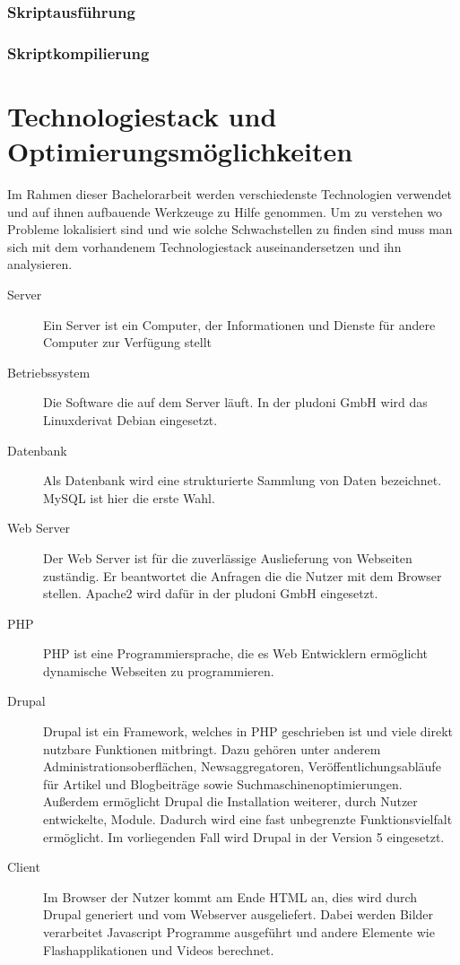 \subsubsection{Skriptausführung}
\subsubsection{Skriptkompilierung}

\section{Technologiestack und Optimierungsmöglichkeiten}
Im Rahmen dieser Bachelorarbeit werden verschiedenste Technologien verwendet und auf ihnen aufbauende Werkzeuge zu Hilfe genommen. Um zu verstehen wo Probleme lokalisiert sind und wie solche Schwachstellen zu finden sind muss man sich mit dem vorhandenem Technologiestack auseinandersetzen und ihn analysieren.
\begin{description}
  \item[Server] Ein Server ist ein Computer, der Informationen und Dienste für andere Computer zur Verfügung stellt
  \item[Betriebssystem] Die Software die auf dem Server läuft. In der pludoni GmbH wird das Linuxderivat Debian eingesetzt.
  \item[Datenbank] Als Datenbank wird eine strukturierte Sammlung von Daten bezeichnet. MySQL ist hier die erste Wahl.
  \item[Web Server] Der Web Server ist für die zuverlässige Auslieferung von Webseiten zuständig. Er beantwortet die Anfragen die die Nutzer mit dem Browser stellen. Apache2 wird dafür in der pludoni GmbH eingesetzt.
  \item[PHP] PHP ist eine Programmiersprache, die es Web Entwicklern ermöglicht dynamische Webseiten zu programmieren.
  \item[Drupal] Drupal ist ein Framework, welches in PHP geschrieben ist und viele direkt nutzbare Funktionen mitbringt. Dazu gehören unter anderem Administrationsoberflächen, Newsaggregatoren, Veröffentlichungsabläufe für Artikel und Blogbeiträge sowie Suchmaschinenoptimierungen. Außerdem ermöglicht Drupal die Installation weiterer, durch Nutzer entwickelte, Module. Dadurch wird eine fast unbegrenzte Funktionsvielfalt ermöglicht. Im vorliegenden Fall wird Drupal in der Version 5 eingesetzt.
  \item[Client] Im Browser der Nutzer kommt am Ende HTML an, dies wird durch Drupal generiert und vom Webserver ausgeliefert. Dabei werden Bilder verarbeitet Javascript Programme ausgeführt und andere Elemente wie Flashapplikationen und Videos berechnet. 
\end{description}



